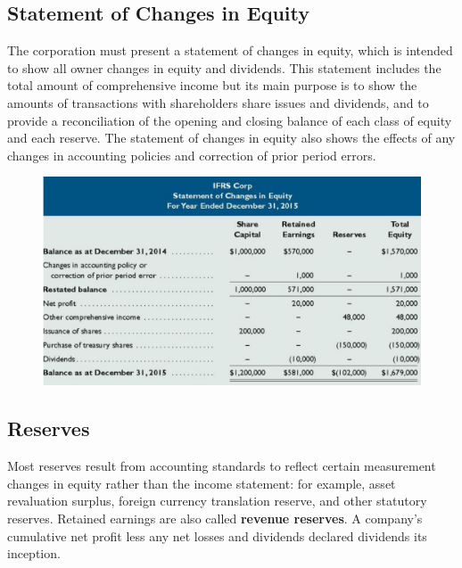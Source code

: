 \documentclass[../main.tex]{subfiles}
\begin{document}
	\subsection{Statement of Changes in Equity}
	
	The  corporation  must  present  a  statement  of  changes  in  equity,  
	which  is  intended  to  show  all  owner changes in equity and dividends. 
	This statement includes the total amount of comprehensive income but its 
	main purpose is to show the amounts of transactions with shareholders 
	\eg  share issues and dividends, and to provide a reconciliation of the 
	opening and closing balance of each class of equity and each reserve. The 
	statement of changes in equity also shows the effects of any changes in 
	accounting policies and correction of prior period errors.
	
	\begin{figure}[ht]
		\centering
		\includegraphics[width=1\columnwidth]{images/c9/sce.png}
	\end{figure}
	
	\subsection{Reserves}
	
	Most reserves result from accounting standards to reflect certain 
	measurement changes in equity rather than the income statement: for 
	example, asset revaluation surplus, foreign currency translation reserve, 
	and other statutory reserves. Retained earnings are also called 
	\textbf{revenue reserves}. A company's cumulative net profit less any net 
	losses and dividends declared dividends its inception.
	
	
	
	
	
	
	
	
	
\end{document}
